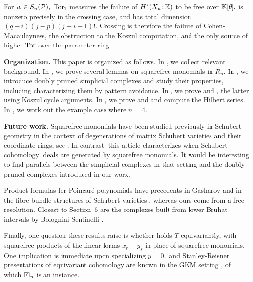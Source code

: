  For $w\in S_n(\mathcal{P}),$ $\operatorname{Tor}_1$ measures the failure of $H^*(X_w;\mathbb{K})$ to be free over $\mathbb{K}[\theta],$ is nonzero precisely in the crossing case, and has total dimension $(q-i)(j-p)(j-i-1)!.$ Crossing is therefore the failure of Cohen-Macaulayness, the obstruction to the Koszul computation, and the only source of higher $\operatorname{Tor}$ over the parameter ring.

\textbf{Organization.}
This paper is organized as follows. In , we collect relevant background. In , we prove several lemmas on squarefree monomials in $R_n.$ In , we introduce doubly pruned simplicial complexes and study their properties, including characterizing them by pattern avoidance. In , we prove  and , the latter using Koszul cycle arguments. In , we prove  and  and compute the Hilbert series.  In , we work out the example case where $n=4.$ 

\textbf{Future work.} Squarefree monomials have been studied previously in Schubert geometry in the context of degenerations of matrix Schubert varieties and their coordinate rings, see \cite{bertiger,brion-lakshmibai, hamaker-pechenik-weigandt,klein-diagonal,knutson-lam-speyer-richardson, knutson-miller-grobner}. In contrast, this article characterizes when Schubert cohomology ideals are generated by squarefree monomials. It would be interesting to find parallels between the simplicial complexes in that setting and the doubly pruned complexes introduced in our work.

Product formulas for Poincar\'e polynomials have precedents in Gasharov \cite{gasharov-factoring} and in the fibre bundle structures of Schubert varieties \cite{alland-richmond,richmond-slofstra}, whereas ours come from a free resolution. Closest to Section~6 are the complexes built from lower Bruhat intervals by Bolognini-Sentinelli \cite{bolognini-sentinelli}.

Finally, one question these results raise is whether  holds $T$-equivariantly, with squarefree products of the linear forms $x_r-y_s$ in place of squarefree monomials. One implication is immediate upon specializing $y=0,$ and Stanley-Reisner presentations of equivariant cohomology are known in the GKM setting \cite{goertsches-solomadin}, of which $\mathrm{Fl}_n$ is an instance.




